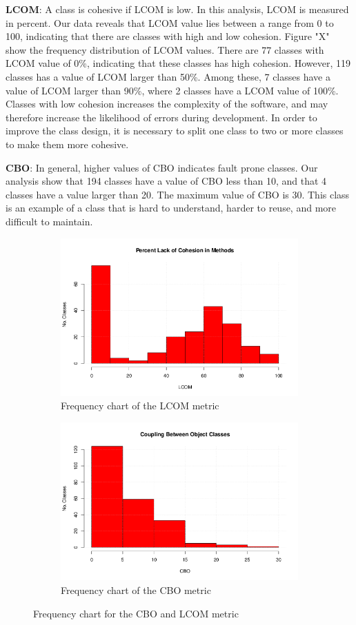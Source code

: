 
\textbf{LCOM}: A class is cohesive if LCOM is low. In this analysis, LCOM is measured in percent. Our data reveals that LCOM value lies between a range from 0 to 100, indicating that there are classes with high and low cohesion. Figure "X" show the frequency distribution of LCOM values. There are 77 classes with LCOM value of 0\%, indicating that these classes has high cohesion. However, 119 classes has a value of LCOM larger than 50\%. Among these, 7 classes have a value of LCOM larger than 90\%, where 2 classes have a LCOM value of 100\%. Classes with low cohesion increases the complexity of the software, and may therefore increase the likelihood of errors during development. In order to improve the class design, it is necessary to split one class to two or more classes to make them more cohesive.



\textbf{CBO}: In general, higher values of CBO indicates fault prone classes. Our analysis show that 194 classes have a value of CBO less than 10, and that 4 classes have a value larger than 20. The maximum value of CBO is 30. This class is an example of a class that is hard to understand, harder to reuse, and more difficult to maintain. 


\begin{figure}[!tbp]
\centering
\begin{subfigure}{\textwidth}
	\centering
	\includegraphics[width=.5\textwidth]{images/LCOM.png}
	\caption{Frequency chart of the LCOM metric}
	\label{fig:lcomdistribution}
\end{subfigure}
\begin{subfigure}{\textwidth}
	\centering
	\includegraphics[width=.5\textwidth]{images/CBO.png}
	\caption{Frequency chart of the CBO metric}
	\label{fig:cbodistribution}
\end{subfigure}
\caption{Frequency chart for the CBO and LCOM metric}
\end{figure}




